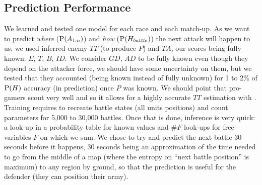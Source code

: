 \subsection{Prediction Performance}
We learned and tested one model for each race and each match-up. As we want to predict \textit{where} ($\mathrm{P}(A_{1:n})$) and \textit{how} ($\mathrm{P}(H_{battle})$) the next attack will happen to us, we used inferred enemy $TT$ (to produce $P$) and $TA$, our scores being fully known: $E$, $T$, $B$, $ID$. We consider $GD$, $AD$ to be fully known even though they depend on the attacker force, we should have some uncertainty on them, but we tested that they accounted (being known instead of fully unknown) for 1 to 2\% of $\mathrm{P}(H)$ accuracy (in prediction) once $P$ was known. We should point that pro-gamers scout very well and so it allows for a highly accurate $TT$ estimation with \cite{SYNNAEVE:StratPred}. Training requires to recreate battle states (all units positions) and count parameters for 5,000 to 30,000 battles. Once that is done, inference is very quick: a look-up in a probability table for known values and $\#F$ look-ups for free variables $F$ on which we sum. We chose to try and predict the next battle 30 seconds before it happens, 30 seconds being an approximation of the time needed to go from the middle of a map (where the entropy on ``next battle position'' is maximum) to any region by ground, so that the prediction is useful for the defender (they can position their army).

